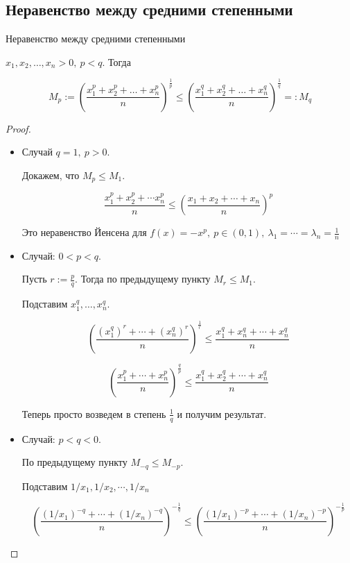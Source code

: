 \subsection{Неравенство между средними степенными \href{https://youtu.be/p9C57KDo1Yg?t=403}{\Walley}}
\begin{theorem-non}
    Неравенство между средними степенными

    $x_1, x_2, \dots, x_n > 0,\ p<q$. Тогда

    \[M_p:=\left(\frac{x_1^p+x_2^p+ \dots+x_n^p}{n}\right)^\frac{1}{p} \leqslant 
    \left(\frac{x_1^q+x_2^q+\dots+x_n^q}{n}\right)^\frac{1}q =: M_q\]
\end{theorem-non}

\begin{proof}
    \quad \\
    \begin{itemize} 
        \item Случай $q = 1,\ p>0$. 
        
        Докажем, что $M_p \leqslant M_1$.

        \[\frac{x_1^p+x_2^p+\cdots x_n^p}{n} \leqslant \left(\frac{x_1+x_2+\cdots+x_n}{n}\right)^p\]
    
        Это неравенство Йенсена для $f(x) = -x^p,\ p\in (0, 1),\ \lambda_1=\cdots=\lambda_n=\frac{1}{n}$
        \item Случай: $0 < p < q$. 
        
        Пусть $r:=\frac{p}{q}$. Тогда по предыдущему пункту $M_r \leqslant M_1$.
        
        Подставим $x_1^q,\dots, x_n^q$.
    
        \[\left(\frac{(x_1^q)^r+\cdots+(x_n^q)^r}{n}\right  )^\frac{1}{r} \leqslant
        \frac{x_1^q+x_n^q+\cdots+x_n^q}{n}\]
    
        \[\left(\frac{x_1^p+\cdots+x_n^p}{n}\right)^\frac{q}{p} \leqslant
        \frac{x_1^q+x_2^q+\cdots+x_n^q}{n}\]
    
        Теперь просто возведем в степень $\frac{1}{q}$ и получим результат.
        \item Случай: $p < q < 0$.
        
        По предыдущему пункту $M_{-q} \leqslant M_{-p}$. 
        
        Подставим $1/x_1, 1/x_2,\cdots, 1/x_n$

        \[ \left(\frac{(1/x_1)^{-q}+\cdots+(1/x_n)^{-q}}{n}\right)^{-\frac{1}{q}} \leqslant
        \left(\frac{(1/x_1)^{-p} + \cdots + (1/x_n)^{-p} }{n}\right)^{-\frac{1}{p}} \]
    

\end{itemize}
\end{proof}
